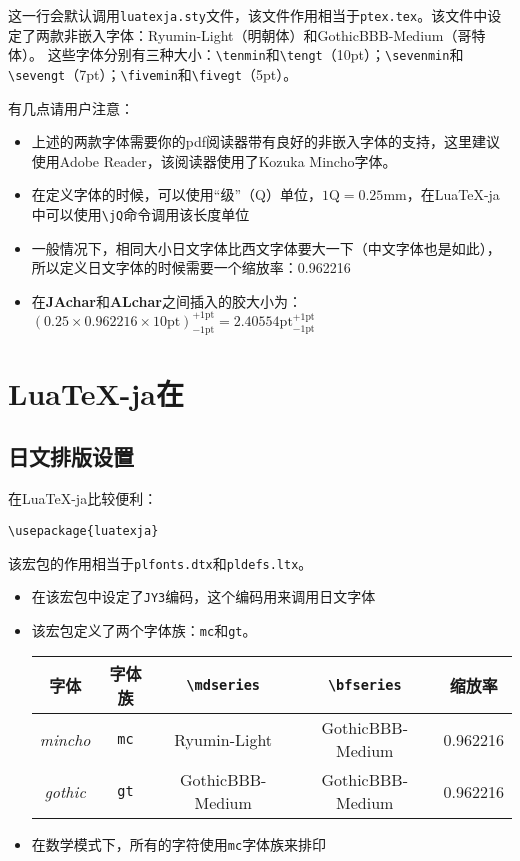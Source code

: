 \documentclass{ltjarticle}
\def\LuaTeX{Lua\TeX}
\def\pTeX{p\TeX}
\def\pLaTeX{p\LaTeX}
\begin{document}
这一行会默认调用\verb!luatexja.sty!文件，该文件作用相当于\verb!ptex.tex!。该文件中设定了两款非嵌入字体：Ryumin-Light（明朝体）和GothicBBB-Medium（哥特体）。
这些字体分别有三种大小：\verb!\tenmin!和\verb!\tengt!（10pt）；\verb!\sevenmin!和\verb!\sevengt!（7pt）；\verb!\fivemin!和\verb!\fivegt!（5pt）。

有几点请用户注意：
\begin{itemize}
\item 上述的两款字体需要你的pdf阅读器带有良好的非嵌入字体的支持，这里建议使用Adobe Reader，该阅读器使用了Kozuka Mincho字体。
\item 在定义字体的时候，可以使用“级”（Q）单位，$1 \mathrm{Q} = 0.25\mathrm{mm}$，在\LuaTeX-ja中可以使用\verb!\jQ!命令调用该长度单位
\item 一般情况下，相同大小日文字体比西文字体要大一下（中文字体也是如此），所以定义日文字体的时候需要一个缩放率：0.962216
\item 在\textbf{JAchar}和\textbf{ALchar}之间插入的胶大小为：$(0.25\times0.962216\times\mathrm{10pt})^{\mathrm{+1pt}}_{\mathrm{-1pt}} = 2.40554\mathrm{pt}^{\mathrm{+1pt}}_{\mathrm{-1pt}}$
\end{itemize}
\section{\LuaTeX-ja在}
\subsection{日文排版设置}
在\LuaTeX-ja比较便利：
\begin{verbatim}
\usepackage{luatexja}
\end{verbatim}

该宏包的作用相当于\verb!plfonts.dtx!和\verb!pldefs.ltx!。
\begin{itemize}
\item 在该宏包中设定了\verb!JY3!编码，这个编码用来调用日文字体
\item 该宏包定义了两个字体族：\verb!mc!和\verb!gt!。\\
\begin{center}
	\begin{tabular}{ccccc}
	\hline
	字体&字体族&\verb!\mdseries!&\verb!\bfseries!&缩放率\\
	\hline
	\textit{mincho}&\verb!mc!&Ryumin-Light&GothicBBB-Medium&0.962216\\
	\textit{gothic}&\verb!gt!&GothicBBB-Medium&GothicBBB-Medium&0.962216\\
	\hline
	\end{tabular}
\end{center}
\item 在数学模式下，所有的字符使用\verb!mc!字体族来排印
\end{itemize}
\end{document}
